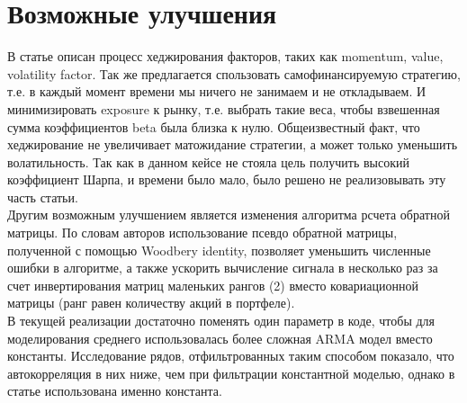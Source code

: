 \documentclass[10pt, a4paper, twocolumn]{article} %
\begin{document}
\section{Возможные улучшения}
В статье описан процесс хеджирования факторов, таких как momentum, value, volatility factor. Так же предлагается
спользовать самофинансируемую стратегию, т.е. в каждый момент времени мы ничего не занимаем и не откладываем. И минимизировать
exposure к рынку, т.е. выбрать такие веса, чтобы взвешенная сумма коэффициентов beta была близка к нулю. Общеизвестный
факт, что хеджирование не увеличивает матожидание стратегии, а может только уменьшить волатильность. Так как в данном кейсе
не стояла цель получить высокий коэффициент Шарпа, и времени было мало, было решено не реализовывать эту часть статьи.\\
Другим возможным улучшением является изменения алгоритма рсчета обратной матрицы. По словам авторов использование псевдо
обратной матрицы, полученной с помощью Woodbery identity, позволяет уменьшить численные ошибки в алгоритме, а также ускорить
вычисление сигнала в несколько раз за счет инвертирования матриц маленьких рангов (2) вместо ковариационной матрицы
(ранг равен количеству акций в портфеле).\\
В текущей реализации достаточно поменять один параметр в коде, чтобы для моделирования среднего использовалась более сложная
ARMA модел вместо константы. Исследование рядов, отфильтрованных таким способом показало, что автокорреляция в них ниже,
чем при фильтрации константной моделью, однако в статье использована именно константа.
\end{document}

